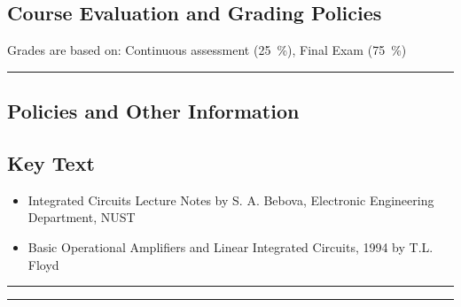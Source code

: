 \subsection*{Course Evaluation and Grading Policies}
Grades are based on:
Continuous assessment (\qty{25}{\percent}),
Final Exam (\qty{75}{\percent})
\vspace{2ex}\hrule\vspace{2ex}



\subsection*{Policies and Other Information}
\subsection*{Key Text}
\begin{itemize}
    \item Integrated Circuits Lecture Notes by  S. A. Bebova, Electronic Engineering Department, NUST
    \item Basic Operational Amplifiers and Linear Integrated Circuits, 1994 by  T.L. Floyd
\end{itemize}
\vspace{2ex}\hrule
\vspace{2ex}\hrule\vspace{2ex}
